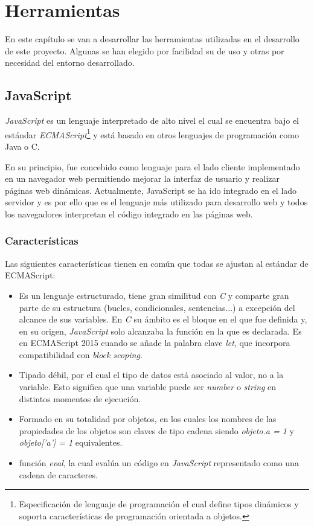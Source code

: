 \chapter{Herramientas}
\label{chap:herramientas}
En este capítulo se van a desarrollar las herramientas utilizadas en el desarrollo de este proyecto. Algunas se han elegido por facilidad su de uso y otras por necesidad del entorno desarrollado.

\section{JavaScript}
\label{sec:js}
\textit{JavaScript} es un lenguaje interpretado de alto nivel el cual se encuentra bajo el estándar \textit{ECMAScript}\footnote{Especificación de lenguaje de programación el cual define tipos dinámicos y soporta características de programación orientada a objetos.} y está basado en otros lenguajes de programación como Java o C.

En su principio, fue concebido como lenguaje para el lado cliente implementado en un navegador web permitiendo mejorar la interfaz de usuario y realizar páginas web dinámicas.
Actualmente, JavaScript se ha ido integrado en el lado servidor y es por ello que es el lenguaje más utilizado para desarrollo web y todos los navegadores interpretan el código integrado en las páginas web.
\subsection{Características}
Las siguientes características tienen en común que todas se ajustan al estándar de ECMAScript:
\begin{itemize}
    \item Es un lenguaje estructurado, tiene gran similitud con \textit{C} y comparte gran parte de su estructura (bucles, condicionales, sentencias...) a excepción del alcance de sus variables. En \textit{C} su ámbito es el bloque en el que fue definida y, en su origen, \textit{JavaScript} solo alcanzaba la función en la que es declarada. Es en ECMAScript 2015 cuando se añade la palabra clave \textit{let}, que incorpora compatibilidad con \textit{block scoping}.
    \item Tipado débil, por el cual el tipo de datos está asociado al valor, no a la variable. Esto significa que una variable puede ser \textit{number} o \textit{string} en distintos momentos de ejecución.
    \item Formado en su totalidad por objetos, en los cuales los nombres de las propiedades de los objetos son claves de tipo cadena siendo \textit{objeto.a = 1} y \textit{objeto['a'] = 1} equivalentes.
    \item función \textit{eval}, la cual evalúa un código en \textit{JavaScript} representado como una cadena de caracteres.


\end{itemize}
